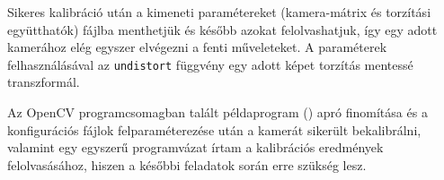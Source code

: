 \documentclass[a4paper,oneside]{article}
\begin{document}

Sikeres kalibráció után a kimeneti paramétereket (kamera-mátrix és torzítási együtthatók) fájlba menthetjük és később azokat felolvashatjuk, így egy adott kamerához elég egyszer elvégezni a fenti műveleteket. A paraméterek felhasználásával az \texttt{undistort} függvény egy adott képet torzítás mentessé transzformál.


Az OpenCV programcsomagban talált példaprogram () apró finomítása és a konfigurációs fájlok felparaméterezése után a kamerát sikerült bekalibrálni, valamint egy egyszerű programvázat írtam a kalibrációs eredmények felolvasásához, hiszen a későbbi feladatok során erre szükség lesz.
\end{document}
